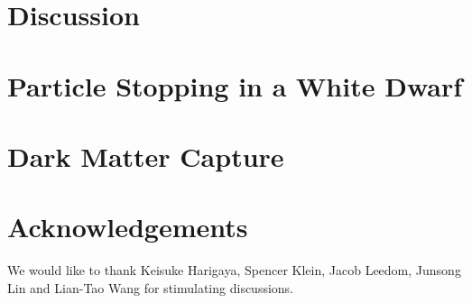 \documentclass[twocolumn, preprintnumbers,amsmath,amssymb,prd, superscriptaddress]{revtex4}
\begin{document}
\section{Discussion}
\label{sec:discussion}


\begin{appendices}
\section{Particle Stopping in a White Dwarf}
\label{sec:wdpdg}

\section{Dark Matter Capture}
\label{sec:capture}

\end{appendices}

\section*{Acknowledgements}
We would like to thank Keisuke Harigaya, Spencer Klein, Jacob Leedom, Junsong Lin and Lian-Tao Wang for stimulating discussions.

\begin{thebibliography}{99}


\end{thebibliography}
\end{document}
